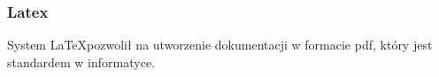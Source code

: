 \documentclass[10pt,leqno]{article}
\begin{document}
\subsubsection{Latex}
System \LaTeX pozwolił na utworzenie dokumentacji w formacie pdf, który jest standardem w informatyce.

\end{document}
